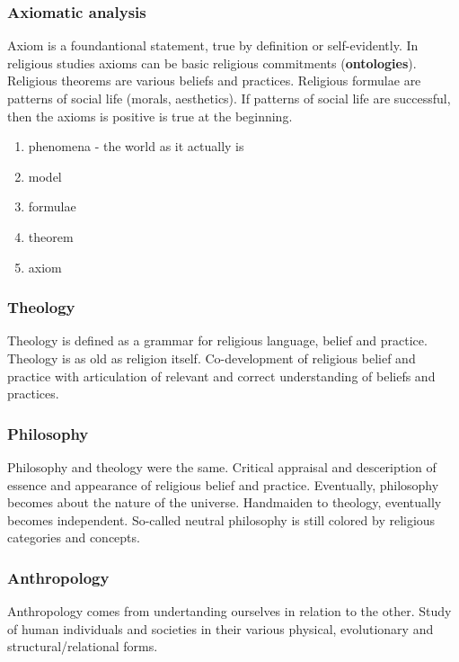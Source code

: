\documentclass{article}
\begin{document}
\subsubsection{Axiomatic analysis}

Axiom is a foundantional statement, true by definition or self-evidently. In religious studies axioms can be basic religious commitments (\textbf{ontologies}). Religious theorems are various beliefs and practices. Religious formulae are patterns of social life (morals, aesthetics). If patterns of social life are successful, then the axioms is positive is true at the beginning.

\begin{enumerate}
  \item phenomena - the world as it actually is
  \item model
  \item formulae
  \item theorem
  \item axiom
\end{enumerate}

\subsubsection{Theology}

Theology is defined as a grammar for religious language, belief and practice. Theology is as old as religion itself. Co-development of religious belief and practice with articulation of relevant and correct understanding of beliefs and practices.

\subsubsection{Philosophy}

Philosophy and theology were the same. Critical appraisal and desceription of essence and appearance of religious belief and practice. Eventually, philosophy becomes about the nature of the universe. Handmaiden to theology, eventually becomes independent. So-called neutral philosophy is still colored by religious categories and concepts.

\subsubsection{Anthropology}

Anthropology comes from undertanding ourselves in relation to the other. Study of human individuals and societies in their various physical, evolutionary and structural/relational forms.
\end{document}
